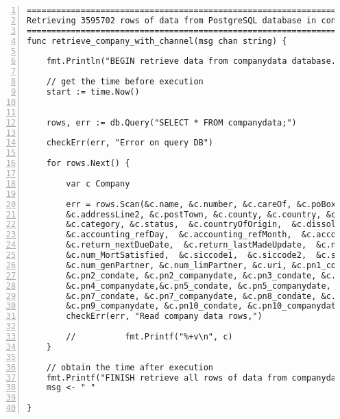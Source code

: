 \lstset{basicstyle=\ttfamily\tiny}  
\begin{lstlisting}[breaklines, frame=single, numbers=left, caption={Function for company data retrieval. (retrieve\_company.go)}, label=commandline-02]
=============================================================================
Retrieving 3595702 rows of data from PostgreSQL database in concurrent manner
=============================================================================
func retrieve_company_with_channel(msg chan string) {

	fmt.Println("BEGIN retrieve data from companydata database.")
	
	// get the time before execution
	start := time.Now()
	
	
	rows, err := db.Query("SELECT * FROM companydata;")
	
	checkErr(err, "Error on query DB")	
	
	for rows.Next() {
	
		var c Company
		
		err = rows.Scan(&c.name, &c.number, &c.careOf, &c.poBox, &c.addressLine1, 
		&c.addressLine2, &c.postTown, &c.county, &c.country, &c.postcode, 
		&c.category, &c.status,  &c.countryOfOrigin,  &c.dissolution_date,  &c.incorporate_date,
		&c.accounting_refDay,  &c.accounting_refMonth,  &c.account_nextDueDate,  &c.account_lastMadeUpdate,  &c.account_category,
		&c.return_nextDueDate,  &c.return_lastMadeUpdate,  &c.num_MortChanges,  &c.num_MortOutstanding,  &c.num_MortPartSatisfied,
		&c.num_MortSatisfied,  &c.siccode1,  &c.siccode2,  &c.siccode3,  &c.siccode4,
		&c.num_genPartner, &c.num_limPartner, &c.uri, &c.pn1_condate, &c.pn1_companydate, 
		&c.pn2_condate, &c.pn2_companydate, &c.pn3_condate, &c.pn3_companydate, &c.pn4_condate,
		&c.pn4_companydate,&c.pn5_condate, &c.pn5_companydate, &c.pn6_condate, &c.pn6_companydate, 
		&c.pn7_condate, &c.pn7_companydate, &c.pn8_condate, &c.pn8_companydate, &c.pn9_condate, 
		&c.pn9_companydate, &c.pn10_condate, &c.pn10_companydate, &c.conf_stmtNextDueDate, &c.conf_stmtLastMadeUpdate)
		checkErr(err, "Read company data rows,")
		
		//			fmt.Printf("%+v\n", c)
	}
	
	// obtain the time after execution
	fmt.Printf("FINISH retrieve all rows of data from companydata database with %.5fs seconds. ", time.Since(start).Seconds())
	msg <- " " 

}

\end{lstlisting}

